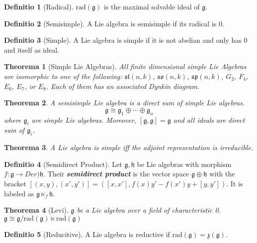 \documentclass[12pt, a4paper]{article}
\newtheorem{theorem}{Theorema}[section]
\theoremstyle{definition}
\newtheorem{definition}{Definitio}[section]
\theoremstyle{remark}
\renewcommand{\emph}[1]{\textbf{\textit{#1}}}
\renewcommand{\sl}{\mathfrak{sl}}
\newcommand{\so}{\mathfrak{so}}
\renewcommand{\sp}{\mathfrak{sp}}
\newcommand{\rad}{\text{rad}}
\newcommand{\mf}[1]{\mathfrak{#1}}
\begin{document}
\begin{definition}[Radical]
	$\rad(\mf{g})$ is the maximal solvable ideal of $\mf{g}$.
\end{definition}

\begin{definition}[Semisimple]
	A Lie algebra is semisimple if its radical is $0$.
\end{definition}

\begin{definition}[Simple]
	A Lie algebra is simple if it is not abelian and only has $0$ and itself as ideal.
\end{definition}

\begin{theorem}[Simple Lie Algebras]
	All finite dimensional simple Lie Algebras are isomorphic to one of the following:
		 $\sl(n, k)$, $\so(n, k)$, $\sp(n, k)$, $G_2$, $F_4$, $E_6$, $E_7$, or $E_8$.
	Each of them has an associated Dynkin diagram.

\end{theorem}

\begin{theorem}
	A semisimple Lie algebra is a direct sum of simple Lie algebras.
	$$\mf{g} \cong \mf{g}_1 \oplus \cdots \oplus \mf{g}_n$$
	where $\mf{g}_i$ are simple Lie algebras.
	Moreover, $[\mf{g}, \mf{g}] = \mf{g}$ and all ideals are direct sum of $\mf{g}_i$.
\end{theorem}

\begin{theorem}
	A Lie algebra is simple iff the adjoint representation is irreducible.
\end{theorem}

\begin{definition}[Semidirect Product]
	Let $\mf{g}, \mf{h}$ be Lie algebras with morphism $f: \mf{g} \rightarrow Der)\mf{h}$. 
	Their \emph{semidirect product} is the vector space $\mf{g} \oplus \mf{h}$ with the bracket $[(x, y), (x', y')] = ([x, x'], f(x)y' - f(x')y + [y, y'])$.
	It is labeled as $\mf{g} \ltimes_f \mf{h}$.
\end{definition}

\begin{theorem}[Levi]
	$\mf{g}$ be a Lie algebra over a field of characteristic 0. $\mf{g} \cong \mf{g}/\rad(\mf{g}) \ltimes \rad(\mf{g})$
\end{theorem}

\begin{definition}[Reducitive]
	A Lie algebra is reductive if $\rad(\mf{g}) = \mf{z}(\mf{g})$.
\end{definition}
\end{document}
